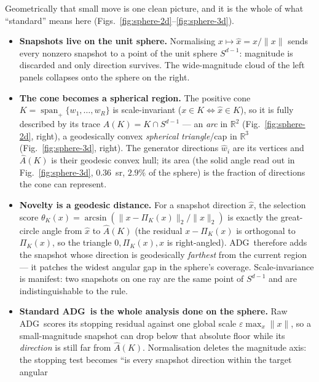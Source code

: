 \documentclass[11pt]{article}
\newcommand{\ADG}{\textsc{ADG}}
\begin{document}
Geometrically that small move is one clean picture, and it is the whole of what
``standard'' means here (Figs.~\ref{fig:sphere-2d}--\ref{fig:sphere-3d}).

\begin{itemize}
  \item \textbf{Snapshots live on the unit sphere.} Normalising
        $x\mapsto \hat x=x/\|x\|$ sends every nonzero snapshot to a point of the
        unit sphere $S^{d-1}$: magnitude is discarded and only direction
        survives. The wide-magnitude cloud of the left panels collapses onto the
        sphere on the right.
  \item \textbf{The cone becomes a spherical region.} The positive cone
        $K=\operatorname{span}_+\{w_1,\dots,w_R\}$ is scale-invariant
        ($x\in K\iff\hat x\in K$), so it is fully described by its trace
        $\widehat A(K)=K\cap S^{d-1}$ --- an \emph{arc} in $\mathbb{R}^2$
        (Fig.~\ref{fig:sphere-2d}, right), a geodesically convex \emph{spherical
        triangle}/cap in $\mathbb{R}^3$ (Fig.~\ref{fig:sphere-3d}, right). The
        generator directions $\hat w_i$ are its vertices and $\widehat A(K)$ is
        their geodesic convex hull; its area (the solid angle read out in
        Fig.~\ref{fig:sphere-3d}, $0.36$~sr, $2.9\%$ of the sphere) is the
        fraction of directions the cone can represent.
  \item \textbf{Novelty is a geodesic distance.} For a snapshot direction
        $\hat x$, the selection score
        $\theta_K(x)=\arcsin(\|x-\Pi_K(x)\|_2/\|x\|_2)$ is exactly the
        great-circle angle from $\hat x$ to $\widehat A(K)$ (the residual
        $x-\Pi_K(x)$ is orthogonal to $\Pi_K(x)$, so the triangle
        $0,\Pi_K(x),x$ is right-angled). \ADG\ therefore adds the snapshot whose
        direction is geodesically \emph{farthest} from the current region --- it
        patches the widest angular gap in the sphere's coverage. Scale-invariance
        is manifest: two snapshots on one ray are the same point of $S^{d-1}$ and
        are indistinguishable to the rule.
  \item \textbf{Standard \ADG\ is the whole analysis done on the sphere.} Raw
        \ADG\ scores its stopping residual against one global scale
        $\varepsilon\max_x\|x\|$, so a small-magnitude snapshot can drop below
        that absolute floor while its \emph{direction} is still far from
        $\widehat A(K)$. Normalisation deletes the magnitude axis: the stopping
        test becomes ``is every snapshot direction within the target angular

\end{itemize}
\end{document}
